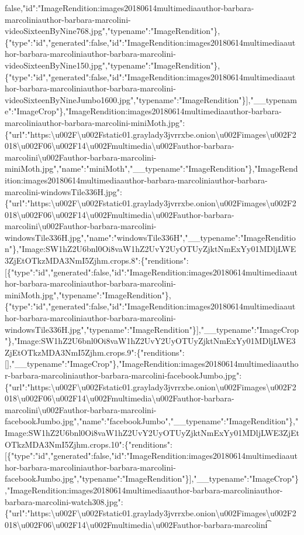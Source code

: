false,"id":"ImageRendition:images20180614multimediaauthor-barbara-marcoliniauthor-barbara-marcolini-videoSixteenByNine768.jpg","typename":"ImageRendition"\},\{"type":"id","generated":false,"id":"ImageRendition:images20180614multimediaauthor-barbara-marcoliniauthor-barbara-marcolini-videoSixteenByNine150.jpg","typename":"ImageRendition"\},\{"type":"id","generated":false,"id":"ImageRendition:images20180614multimediaauthor-barbara-marcoliniauthor-barbara-marcolini-videoSixteenByNineJumbo1600.jpg","typename":"ImageRendition"\}{]},"\_\_typename":"ImageCrop"\},"ImageRendition:images20180614multimediaauthor-barbara-marcoliniauthor-barbara-marcolini-miniMoth.jpg":\{"url":"https:\textbackslash{}u002F\textbackslash{}u002Fstatic01.graylady3jvrrxbe.onion\textbackslash{}u002Fimages\textbackslash{}u002F2018\textbackslash{}u002F06\textbackslash{}u002F14\textbackslash{}u002Fmultimedia\textbackslash{}u002Fauthor-barbara-marcolini\textbackslash{}u002Fauthor-barbara-marcolini-miniMoth.jpg","name":"miniMoth","\_\_typename":"ImageRendition"\},"ImageRendition:images20180614multimediaauthor-barbara-marcoliniauthor-barbara-marcolini-windowsTile336H.jpg":\{"url":"https:\textbackslash{}u002F\textbackslash{}u002Fstatic01.graylady3jvrrxbe.onion\textbackslash{}u002Fimages\textbackslash{}u002F2018\textbackslash{}u002F06\textbackslash{}u002F14\textbackslash{}u002Fmultimedia\textbackslash{}u002Fauthor-barbara-marcolini\textbackslash{}u002Fauthor-barbara-marcolini-windowsTile336H.jpg","name":"windowsTile336H","\_\_typename":"ImageRendition"\},"Image:SW1hZ2U6bnl0Oi8vaW1hZ2UvY2UyOTUyZjktNmExYy01MDljLWE3ZjEtOTkzMDA3NmI5Zjhm.crops.8":\{"renditions":{[}\{"type":"id","generated":false,"id":"ImageRendition:images20180614multimediaauthor-barbara-marcoliniauthor-barbara-marcolini-miniMoth.jpg","typename":"ImageRendition"\},\{"type":"id","generated":false,"id":"ImageRendition:images20180614multimediaauthor-barbara-marcoliniauthor-barbara-marcolini-windowsTile336H.jpg","typename":"ImageRendition"\}{]},"\_\_typename":"ImageCrop"\},"Image:SW1hZ2U6bnl0Oi8vaW1hZ2UvY2UyOTUyZjktNmExYy01MDljLWE3ZjEtOTkzMDA3NmI5Zjhm.crops.9":\{"renditions":{[}{]},"\_\_typename":"ImageCrop"\},"ImageRendition:images20180614multimediaauthor-barbara-marcoliniauthor-barbara-marcolini-facebookJumbo.jpg":\{"url":"https:\textbackslash{}u002F\textbackslash{}u002Fstatic01.graylady3jvrrxbe.onion\textbackslash{}u002Fimages\textbackslash{}u002F2018\textbackslash{}u002F06\textbackslash{}u002F14\textbackslash{}u002Fmultimedia\textbackslash{}u002Fauthor-barbara-marcolini\textbackslash{}u002Fauthor-barbara-marcolini-facebookJumbo.jpg","name":"facebookJumbo","\_\_typename":"ImageRendition"\},"Image:SW1hZ2U6bnl0Oi8vaW1hZ2UvY2UyOTUyZjktNmExYy01MDljLWE3ZjEtOTkzMDA3NmI5Zjhm.crops.10":\{"renditions":{[}\{"type":"id","generated":false,"id":"ImageRendition:images20180614multimediaauthor-barbara-marcoliniauthor-barbara-marcolini-facebookJumbo.jpg","typename":"ImageRendition"\}{]},"\_\_typename":"ImageCrop"\},"ImageRendition:images20180614multimediaauthor-barbara-marcoliniauthor-barbara-marcolini-watch308.jpg":\{"url":"https:\textbackslash{}u002F\textbackslash{}u002Fstatic01.graylady3jvrrxbe.onion\textbackslash{}u002Fimages\textbackslash{}u002F2018\textbackslash{}u002F06\textbackslash{}u002F14\textbackslash{}u002Fmultimedia\textbackslash{}u002Fauthor-barbara-marcolini\t